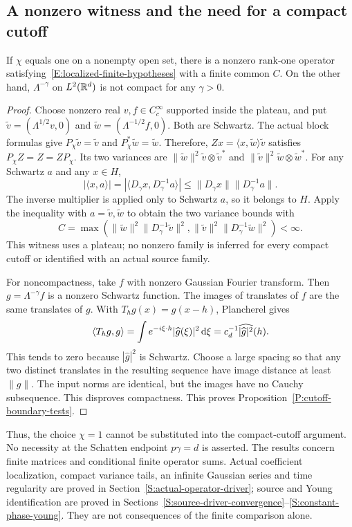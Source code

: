 \subsection{A nonzero witness and the need for a compact cutoff}

\begin{proposition}\label{P:cutoff-boundary-tests}
  If $\chi$ equals one on a nonempty open set, there is a nonzero rank-one
  operator satisfying~\eqref{E:localized-finite-hypotheses} with a finite
  common $C$. On the other hand, $\Lambda^{-\gamma}$ on $L^2(\mathbb{R}^d)$ is
  not compact for any $\gamma > 0$.
\end{proposition}

\begin{proof}
  Choose nonzero real $v,f \in C_c^\infty$ supported inside the plateau,
  and put $\widetilde v=(\Lambda^{1/2}v,0)$ and
  $\widetilde w=(\Lambda^{-1/2}f,0)$. Both are Schwartz. The actual block
  formulas give $P_\chi\widetilde v=\widetilde v$ and
  $P_\chi^*\widetilde w=\widetilde w$. Therefore,
  $Zx=\langle x,\widetilde w\rangle\widetilde v$ satisfies
  $P_\chi Z=Z=ZP_\chi$. Its two variances are
  $\|\widetilde w\|^2\widetilde v\otimes\widetilde v^*$ and
  $\|\widetilde v\|^2\widetilde w\otimes\widetilde w^*$. For any Schwartz
  $a$ and any $x \in H$,
  \[
    |\langle x,a\rangle|
    =|\langle D_\gamma x,D_\gamma^{-1}a\rangle|
    \le\|D_\gamma x\|\|D_\gamma^{-1}a\|.
  \]
  The inverse multiplier is applied only to Schwartz $a$, so it belongs
  to $H$. Apply the inequality with $a=\widetilde v,\widetilde w$ to obtain
  the two variance bounds with
  \[
    C=\max\left(
    \|\widetilde w\|^2\|D_\gamma^{-1}\widetilde v\|^2,
    \|\widetilde v\|^2\|D_\gamma^{-1}\widetilde w\|^2\right)<\infty.
  \]
  This witness uses a plateau; no nonzero family is inferred for every
  compact cutoff or identified with an actual source family.

  For noncompactness, take $f$ with nonzero Gaussian Fourier transform.
  Then $g=\Lambda^{-\gamma}f$ is a nonzero Schwartz function. The images
  of translates of $f$ are the same translates of $g$. With
  $T_hg(x)=g(x-h)$, Plancherel gives
  \[
    \langle T_hg,g\rangle
    =\int e^{-i\xi\cdot h}|\widehat g(\xi)|^2\,\mathrm{d}\xi
    =c_d^{-1}\widehat{|\widehat g|^2}(h).
  \]
  This tends to zero because $|\widehat g|^2$ is Schwartz. Choose a large
  spacing so that any two distinct translates in
  the resulting sequence have image distance at least $\|g\|$. The input
  norms are identical, but the images have no Cauchy subsequence. This
  disproves compactness.
  This proves Proposition~\ref{P:cutoff-boundary-tests}.
\end{proof}

Thus, the choice $\chi=1$ cannot be substituted into the compact-cutoff
argument. No necessity at the Schatten endpoint $p\gamma=d$ is asserted.
The results concern finite matrices and conditional finite operator sums.
Actual coefficient localization, compact variance tails, an infinite
Gaussian series and time regularity are proved in
Section~\ref{S:actual-operator-driver}; source and Young identification
are proved in Sections~\ref{S:source-driver-convergence}--\ref{S:constant-phase-young}.
They are not consequences of the finite comparison alone.
